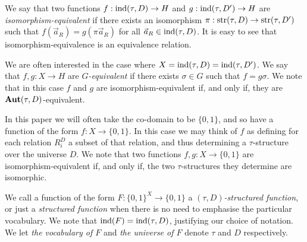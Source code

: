 \documentclass[../paper.tex]{subfiles}
\begin{document}
We say that two functions $f: \text{\upshape ind}(\tau, D) \rightarrow H$ and $g: \text{\upshape ind}(\tau,
D') \rightarrow H$ are \emph{isomorphism-equivalent} if there exists an
isomorphism $\pi :\text{str}(\tau, D) \rightarrow \text{str}(\tau, D')$ such that
$f(\vec{a}_R) = g(\pi \vec{a}_R)$ for all $\vec{a}_R \in \text{\upshape ind}(\tau, D)$. It is
easy to see that isomorphism-equivalence is an equivalence relation.

We are often interested in the case where $X = \text{\upshape ind}(\tau, D) = \text{\upshape ind}(\tau, D')$.
We say that $f, g: X \rightarrow H$ are \emph{$G$-equivalent} if there exists
$\sigma \in G$ such that $f = g \sigma$. We note that in this case $f$ and $g$
are isomorphism-equivalent if, and only if, they are $\text{\textbf{Aut}}(\tau, D)$-equivalent.

In this paper we will often take the co-domain to be $\{0,1\}$, and so have a
function of the form $f : X \rightarrow \{0,1\}$. In this case we may think of
$f$ as defining for each relation $R^D_i$ a subset of that relation, and thus
determining a $\tau$-structure over the universe $D$. We note that two functions
$f, g: X \rightarrow \{0,1\}$ are isomorphism-equivalent if, and only if, the
two $\tau$-structures they determine are isomorphic.

We call a function of the form $F:\{0,1\}^{X} \rightarrow \{0,1\}$ a
\emph{$(\tau, D)$-structured function}, or just a \emph{structured function}
when there is no need to emphasise the particular vocabulary. We note that
$\text{\upshape ind}(F) = \text{\upshape ind}(\tau, D)$, justifying our choice of notation. We let \emph{the
  vocabulary of $F$} and \emph{the universe of $F$} denote $\tau$ and $D$
respectively.


\end{document}
